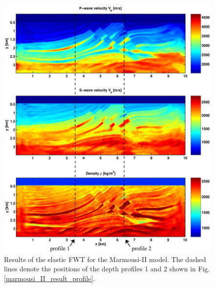 \begin{figure}
\centering
\includegraphics[width=15cm]{figures/marmousi/marmousi_II_result_1.pdf}
\caption{Results of the elastic FWT for the Marmousi-II model. The dashed lines denote the positions of the depth profiles 1 and 2 shown in Fig. \ref{marmousi_II_result_profile}.}
\label{marmousi_II_result}
\end{figure}
\clearpage
